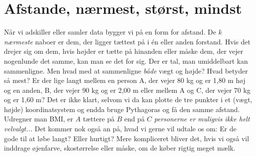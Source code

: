 \documentclass[a4paper, 12pt]{article}
\theoremstyle{remark}
\begin{document}
\section*{Afstande, nærmest, størst, mindst}
Når vi adskiller eller samler data bygger vi på en form for afstand. De $k$ \emph{ nærmeste} naboer er dem, der ligger tættest på i én eller anden forstand. 
Hvis det drejer sig om dem, hvis højder er tætte på hinanden eller måske dem, der vejer nogenlunde det samme, kan man se det for sig. 
Der er tal, man umiddelbart kan sammenligne. Men hvad med at sammenligne \emph{både} vægt og højde? Hvad betyder så mest? 
Er der lige langt mellem en person A, der vejer 80 kg og er 1,80 m høj og en anden, B,  der vejer 90 kg og er 2,00 m eller mellem A og C, der vejer 70 kg og er 1,60 m? 
Det er ikke klart, selvom vi da kan plotte de tre punkter i et (vægt, højde) koordinatsystem og endda bruge Pythagoras og få den samme afstand. 
Udregner man BMI, er $A$ tættere på $B$ end på $C$  \emph{personerne er muligvis ikke helt velvalgt...}
Det kommer nok også an på, hvad vi gerne vil udtale os om: Er de gode til at løbe langt? Eller hurtigt? Mere kompliceret bliver det, hvis vi også vil inddrage øjenfarve, skostørrelse eller måske, om de køber rigtig meget mælk.
\end{document}
